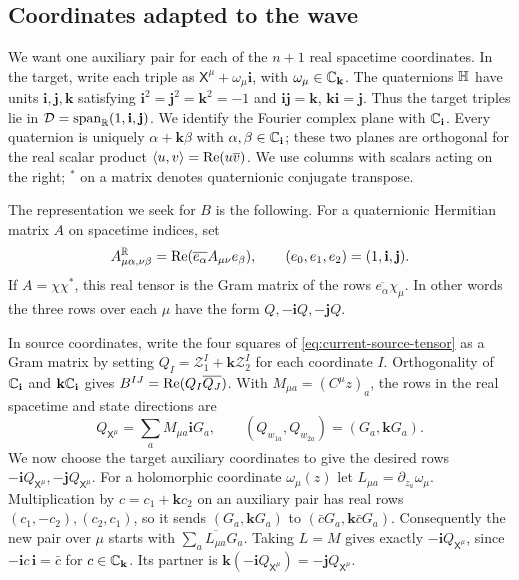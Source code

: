 \subsection{Coordinates adapted to the wave}

We want one auxiliary pair for each of the $n+1$ real spacetime
coordinates. In the target, write each triple as $\mathsf X^\mu+
\omega_\mu\mathbf i$, with $\omega_\mu\in\mathbb C_{\mathbf k}$. The
quaternions $\mathbb H$ have units $\mathbf i,\mathbf j,\mathbf k$ satisfying
$\mathbf i^2=\mathbf j^2=\mathbf k^2=-1$ and
$\mathbf i\mathbf j=\mathbf k$, $\mathbf k\mathbf i=\mathbf j$.
Thus the target triples lie in
$\mathcal D=\operatorname{span}_{\mathbb R}(1,\mathbf i,\mathbf j)$.
We identify the Fourier complex plane with $\mathbb C_{\mathbf i}$.
Every quaternion is uniquely $\alpha+\mathbf k\beta$ with
$\alpha,\beta\in\mathbb C_{\mathbf i}$; these two planes are orthogonal for
the real scalar product $\langle u,v\rangle=\operatorname{Re}(u\overline v)$.
We use columns with scalars acting on the right; $^*$ on a matrix
denotes quaternionic conjugate transpose.

The representation we seek for $B$ is the following. For a quaternionic
Hermitian matrix $A$ on spacetime indices, set
\begin{equation}\label{eq:current-real-tensor}
 A^{\mathbb R}_{\mu\alpha,\nu\beta}
   =\operatorname{Re}(\overline{e_\alpha}A_{\mu\nu}e_\beta),\qquad
 (e_0,e_1,e_2)=(1,\mathbf i,\mathbf j).
\end{equation}
If $A=\chi\chi^*$, this real tensor is the Gram matrix of the rows
$\overline{e_\alpha}\chi_\mu$. In other words the three rows over
each $\mu$ have the form $Q,-\mathbf iQ,-\mathbf jQ$.

In source coordinates, write the four squares of
\eqref{eq:current-source-tensor} as a Gram matrix by setting
$Q_I=\mathcal Z_1^I+\mathbf k\mathcal Z_2^I$ for each coordinate $I$.
Orthogonality of $\mathbb C_{\mathbf i}$ and $\mathbf k\mathbb C_{\mathbf i}$
gives $B^{IJ}=\operatorname{Re}(Q_I\overline{Q_J})$. With
$M_{\mu a}=(C^\mu z)_a$, the rows in the real spacetime and state
directions are
\[
 Q_{\mathsf X^\mu}=\sum_a M_{\mu a}\mathbf i G_a,\qquad
 (Q_{w_{1a}},Q_{w_{2a}})=(G_a,\mathbf kG_a).
\]
We now choose the target auxiliary coordinates to give the desired
rows $-\mathbf i Q_{\mathsf X^\mu},-\mathbf j Q_{\mathsf X^\mu}$.
For a holomorphic coordinate $\omega_\mu(z)$ let
$L_{\mu a}=\partial_{z_a}\omega_\mu$. Multiplication by
$c=c_1+\mathbf k c_2$ on an auxiliary pair has real rows
$(c_1,-c_2),(c_2,c_1)$, so it sends $(G_a,\mathbf kG_a)$ to
$(\bar cG_a,\mathbf k\bar cG_a)$. Consequently the new pair over
$\mu$ starts with $\sum_a\overline{L_{\mu a}}G_a$. Taking $L=M$
gives exactly $-\mathbf i Q_{\mathsf X^\mu}$, since
$-\mathbf i c\,\mathbf i=\bar c$ for $c\in\mathbb C_{\mathbf k}$.
Its partner is $\mathbf k(-\mathbf i Q_{\mathsf X^\mu})
=-\mathbf j Q_{\mathsf X^\mu}$.

